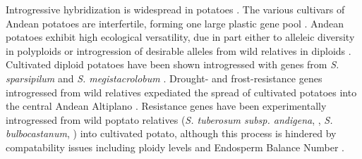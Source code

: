 \documentclass[11pt]{article}
\begin{document}
\begin{enumerate}
Introgressive hybridization is widespread in potatoes \cite{grun1990evolution}.
The various cultivars of Andean potatoes are interfertile, forming one large plastic gene pool \cite{quiros1992increase}.
Andean potatoes exhibit high ecological versatility, due in part either to alleleic diversity in polyploids or introgression of desirable alleles from wild relatives in diploids \cite{zimmerer1998ecogeography}.
Cultivated diploid potatoes have been shown introgressed with genes from \emph{S. sparsipilum} \cite{rabinowitz1990high} and \emph{S. megistacrolobum} \cite{johns1987relationships, huaman1980solanum}.
Drought- and frost-resistance genes introgressed from wild relatives expediated the spread of cultivated potatoes into the central Andean Altiplano \cite{johns1986ongoing, hawkes1962origin, schmiediche1980breeding}.
Resistance genes have been experimentally introgressed from wild poptato relatives (\emph{S. tuberosum subsp. andigena}, \cite{van1999tight}, \emph{S. bulbocastanum}, \cite{van2003ancient}) into cultivated potato, although this process is hindered by compatability issues including ploidy levels and Endosperm Balance Number \cite{johnston1980significance}.
















\end{enumerate}

	

	
	
	
	
	
	
	
	
\end{document}
